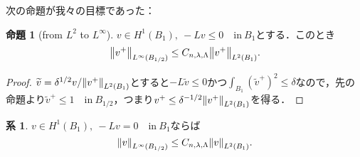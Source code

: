\documentclass[a4paper]{ltjsarticle}
\newcommand{\inn}{\quad\text{in}\ }
\newcommand{\1}{\mathbbm{1}}
\numberwithin{equation}{section}
\theoremstyle{definition}
\newtheorem{cor}[thm]{系}
\newtheorem{prop}[thm]{命題}
\begin{document}
次の命題が我々の目標であった：
\begin{prop}[from $L^2$ to $L^\infty$]\label{prop:2_vs_infty}
    $v\in H^1(B_1),\ -Lv\leq 0\inn B_1$とする．このとき
    \begin{equation}
        \norm{v^+}_{L^\infty(B_{1/2})}\leq C_{n,\lambda,\Lambda}\norm{v^+}_{L^2(B_1)}.
    \end{equation}
\end{prop}
\begin{proof}
    $\widetilde{v}=\delta^{1/2}v/\norm{v^+}_{L^2(B_1)}$とすると$-L\widetilde{v}\leq0$かつ$\int_{B_1}(\widetilde{v}^+)^2\leq\delta$なので，先の命題より$\widetilde{v}^+\leq1\inn B_{1/2}$，つまり$v^+\leq \delta^{-1/2}\norm{v^+}_{L^2(B_1)}$を得る．
\end{proof}
\begin{cor}
    $v\in H^{1}(B_1),\ -Lv=0\inn B_1$ならば
    \begin{equation}
        \norm{v}_{L^\infty(B_{1/2})}\leq C_{n,\lambda,\Lambda}\norm{v}_{L^2(B_1)}.
    \end{equation}
\end{cor}
\end{document}
